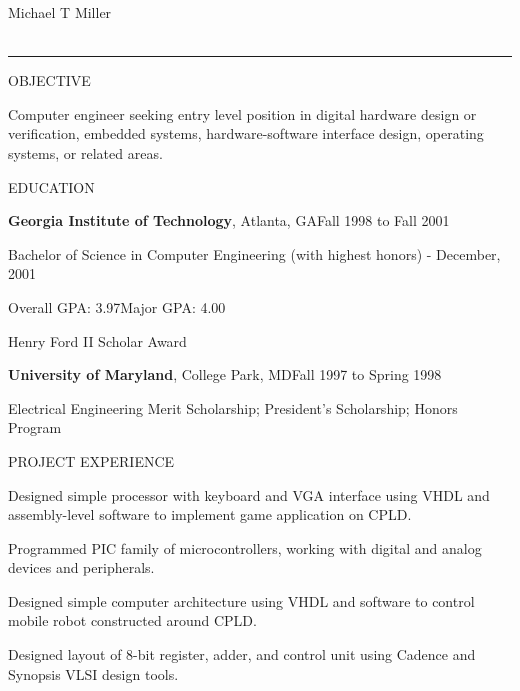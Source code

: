 \documentclass[letterpaper,10pt]{article}
\newenvironment{narrowitemize}{
    \begin{list}{\textbullet{}}{%
        \setlength{\topsep}{0pt}%
        \setlength{\itemsep}{0pt}%
        \setlength{\parsep}{0pt}%
    }
}{\end{list}}
\begin{document}
\begin{center}
    {\Large Michael T Miller} \\
     \textbullet{}  \textbullet{}  \\
    
    \rule[4pt]{\columnwidth}{0.5pt}
\end{center}

\noindent OBJECTIVE

\addtolength{\columnwidth}{-\parindent}

\parbox[t]{\columnwidth}{Computer engineer seeking entry level
position in digital hardware design or verification, embedded systems,
hardware-software interface design, operating systems, or related
areas.}

\bigskip

\noindent EDUCATION

\textbf{Georgia Institute of Technology}, Atlanta, GA\hfill{}Fall 1998
to Fall 2001

Bachelor of Science in Computer Engineering (with highest honors) -
December, 2001

Overall GPA: 3.97\hspace{\parindent}Major GPA: 4.00

\hspace{\parindent}Henry Ford II Scholar Award

\medskip

\textbf{University of Maryland}, College Park, MD\hfill{}Fall 1997 to
Spring 1998

\hspace{\parindent}Electrical Engineering Merit Scholarship;
President's Scholarship; Honors Program

\bigskip

\noindent PROJECT EXPERIENCE

\begin{narrowitemize}

    \item Designed simple processor with keyboard and VGA interface
          using VHDL and assembly-level software to implement game
          application on CPLD.

    \item Programmed PIC family of microcontrollers, working with
          digital and analog devices and peripherals.

    \item Designed simple computer architecture using VHDL and
          software to control mobile robot constructed around CPLD.

    \item Designed layout of 8-bit register, adder, and control unit
          using Cadence and Synopsis VLSI design tools.

\end{narrowitemize}
\end{document}
